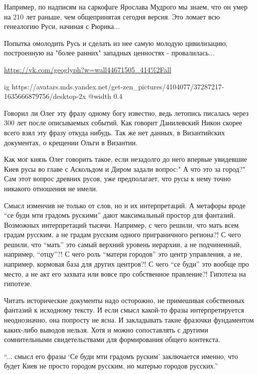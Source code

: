 \begin{itemize}
Например, по надписям на саркофаге Ярослава Мудрого мы знаем, что он умер на
210 лет раньше, чем общепринятая сегодня версия. Это ломает всю генеалогию
Руси, начиная с Рюрика...

Попытка омолодить Русь и сделать из нее самую молодую цивилизацию, построенную
на "более ранних" западных ценностях - провалилась...

\url{https://vk.com/geoglyph?w=wall44671505_414%2Fall}

\ifcmt
  ig https://avatars.mds.yandex.net/get-zen_pictures/4104077/37287217-1635666879756/desktop-2x
  @width 0.4
\fi


Говорил ли Олег эту фразу одному богу известно, ведь летопись писалась через 300
лет после описываемых событий. Как говорит Данилевский Никон скорее всего взял
эту фразу откуда нибудь. Так же нет данных, в Византийских документах, о крещении
Ольги в Византии.


Как мог князь Олег говорить такое, если незадолго до него впервые увидевшие
Киев русы во главе с Аскольдом и Диром задали вопрос:" А что это за город?" Сам
этот вопрос древних русов, уже предполагает, что русы к нему точно никакого
отношения не имели.


Смысл изменчив не только от слов, но и их интерпретаций. А метафоры вроде \enquote{се
буди мти градомъ рускими} дают максимальный простор для фантазий. Возможных
интерпретаций тысячи. Например, с чего решили, что мать всем градам русским, а
не градам русским одного приграничного региона?! С чего решили, что \enquote{мать} это
самый верхний уровень иерархии, а не подчиненный, например, \enquote{отцу}?! С чего
роль \enquote{матери городов} это центр управления, а не, например, кормовая база для
других центров?! С чего \enquote{се буди} это вообще про место, а не акт его захвата
или вовсе про собственное правление?! Гипотеза на гипотезе.

Читать исторические документы надо осторожно, не примешивая собственных
фантазий к исходному тексту. И если смысл какой-то фразы интерпретируется
неоднозначно, она попросту не ясна. И закладывать такие фразочки фундаментом
каких-либо выводов нельзя. Хотя и можно сопоставлять с другими сомнительными
свидетельствами для формирования общего контекста.


\enquote{... смысл его фразы \enquote{Се буди мти градомъ руским} заключается именно, что будет
Киев не просто городом русским, но матерью городов русских.}


\end{itemize}
